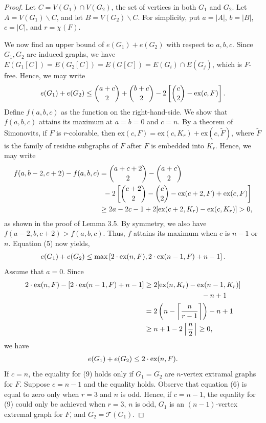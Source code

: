 \documentclass[a4paper]{article}
\begin{document}
\begin{proof}
  Let $C = V(G_1) \cap V(G_2)$, the set of vertices in both $G_1$ and $G_2$. Let $A = V(G_1)
  \backslash C$, and let $B = V(G_2) \backslash C$. For simplicity, put $a = |A|$, $b = |B|$, $c
  = |C|$, and $r = \chi(F)$.

  We now find an upper bound of $e(G_1) + e(G_2)$ with respect to $a, b, c$. Since $G_1, G_2$ are
  induced graphs, we have $E(G_1[C]) = E(G_2[C]) = E(G[C]) = E(G_i) \cap E(G_j)$, which is $F$-free.
  Hence, we may write
  \begin{gather}
    e(G_1) + e(G_2) \leq \binom{a + c}{2} +  \binom{b + c}{2} - 2\left[\binom{c}{2} - \textnormal{ex}(c, F)\right].
  \end{gather}
  Define $f(a, b, c)$ as the function on the right-hand-side. We show that $f(a, b, c)$ attains its
  maximum at $a = b = 0$ and $c = n$. By a theorem of Simonovits, if $F$ is $r$-colorable, then
  $\text{ex}(c, F) = \text{ex}(c, K_r) + \text{ex}(c, \tilde{F})$, where $\tilde{F}$ is the family
  of residue subgraphs of $F$ after $F$ is embedded into $K_r$. Hence, we may write
  \begin{align*}
    f(a, b - 2, c + 2) - f(a, b, c)
    &= \binom{a + c + 2}{2} - \binom{a + c}{2} \\
    &\;\; - 2\left[\binom{c + 2}{2} - \binom{c}{2} - \textnormal{ex}(c + 2, F) + \textnormal{ex}(c, F)\right] \\
    &\geq 2a - 2c - 1 + 2[\textnormal{ex}(c + 2, K_r) - \textnormal{ex}(c, K_r)] > 0,
  \end{align*}
  as shown in the proof of Lemma 3.5. By symmetry, we also have $f(a - 2, b, c + 2) > f(a, b, c)$.
  Thus, $f$ attains its maximum when $c$ is $n - 1$ or $n$. Equation (5) now yields, 
  \begin{align*}
    e(G_1) + e(G_2) \leq \max\left[2 \cdot \textnormal{ex}(n, F), 2 \cdot \textnormal{ex}(n - 1, F) + n - 1\right].
  \end{align*}
  Assume that $a = 0$. Since
  \begin{align}
    2 \cdot \textnormal{ex}(n, F) - [2 \cdot \textnormal{ex}(n - 1, F) + n - 1]
    &\geq 2[\textnormal{ex}(n, K_r) - \textnormal{ex}(n - 1, K_r)] \\
    &\qquad\qquad\qquad\qquad - n + 1 \\
    &= 2\left(n - \left\lceil \frac{n}{r - 1} \right\rceil\right) - n + 1 \\
    &\geq n + 1 - 2\left\lceil \frac{n}{2} \right\rceil \geq 0, \nonumber
  \end{align}
  we have
  \begin{gather}
    e(G_1) + e(G_2) \leq 2 \cdot \textnormal{ex}(n, F).
  \end{gather}
  If $c = n$, the equality for (9) holds only if $G_1 = G_2$ are $n$-vertex extramal graphs for $F$.
  Suppose $c = n - 1$ and the equality holds. Observe that equation (6) is equal to zero only when
  $r = 3$ and $n$ is odd. Hence, if $c = n - 1$, the equality for (9) could only be achieved when $r
  = 3$, $n$ is odd, $G_1$ is an $(n - 1)$-vertex extremal graph for $F$, and $G_2 =
  \mathcal{T}(G_1)$.
\end{proof}
\end{document}
